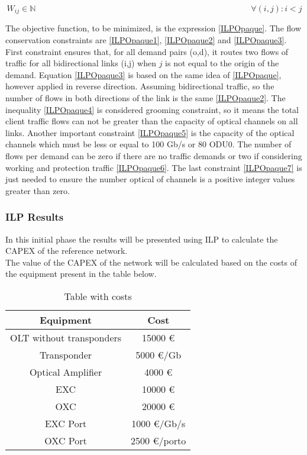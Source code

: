 \vspace{-5pt}
\begin{equation}
W_{ij} \in \mathbb{N}  \qquad \qquad \qquad \qquad \qquad \qquad \qquad \qquad \qquad \qquad \qquad \qquad \qquad
\forall(i,j) : i < j\label{ILPOpaque7}
\end{equation}

\vspace{10pt}

The objective function, to be minimized, is the expression \ref{ILPOpaque}. The flow conservation constraints are \ref{ILPOpaque1}, \ref{ILPOpaque2} and \ref{ILPOpaque3}. First constraint ensures that, for all demand pairs (o,d), it routes two flows of traffic for all bidirectional links (i,j) when $j$ is not equal to the origin of the demand. Equation \ref{ILPOpaque3} is based on the same idea of \ref{ILPOpaque}, however applied in reverse direction. Assuming bidirectional traffic, so the number of flows in both directions of the link is the same \ref{ILPOpaque2}. The inequality \ref{ILPOpaque4} is considered grooming constraint, so it means the total client traffic flows can not be greater than the capacity of optical channels on all links. Another important constraint \ref{ILPOpaque5} is the capacity of the optical channels which must be less or equal to 100 Gb/s or 80 ODU0. The number of flows per demand can be zero if there are no traffic demands or two if considering working and protection traffic \ref{ILPOpaque6}. The last constraint \ref{ILPOpaque7} is just needed to ensure the number optical of channels is a positive integer values greater than zero.

\newpage
\subsubsection{ILP Results}

In this initial phase the results will be presented using ILP to calculate the CAPEX of the reference network. \\

The value of the CAPEX of the network will be calculated based on the costs of the equipment present in the table below.

\begin{table}[h!]
\centering
\begin{tabular}{|| c | c||}
 \hline
 Equipment & Cost \\
 \hline\hline
 OLT without transponders & 15000 \euro \\
 Transponder & 5000 \euro/Gb \\
 Optical Amplifier & 4000 \euro \\
 EXC & 10000 \euro \\
 OXC & 20000 \euro \\
 EXC Port & 1000 \euro /Gb/s\\
 OXC Port & 2500 \euro /porto \\
 \hline
\end{tabular}
\caption{Table with costs}
\label{table_cost1}
\end{table}

